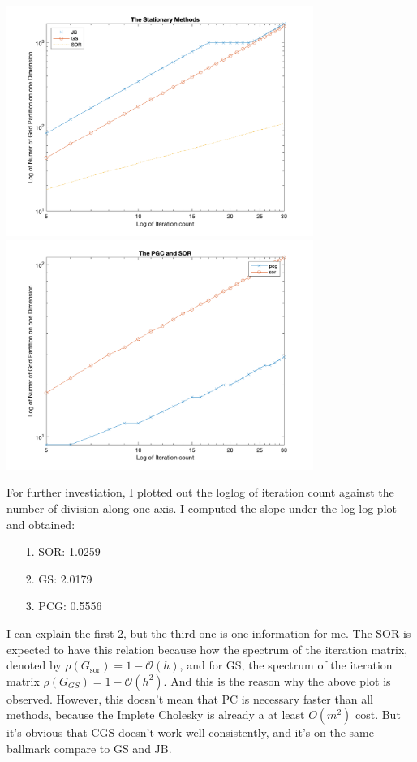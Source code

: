 \documentclass[]{article}
\begin{document}
    \begin{center}
        \includegraphics[width=10cm]{h_vs_stationary_methods.png}
        \includegraphics[width=10cm]{h_vs_pcg_sor.png}    
    \end{center}
    For further investiation, I plotted out the loglog of iteration count against the number of division along one axis. I computed the slope under the log log plot and obtained: 
    \begin{enumerate}
        \item [1.]SOR: 1.0259
        \item [2.]GS: 2.0179
        \item [3.]PCG: 0.5556
    \end{enumerate}
    I can explain the first 2, but the third one is one information for me. The SOR is expected to have this relation because how the spectrum of the iteration matrix, denoted by $\rho(G_{\text{sor}}) = 1 - \mathcal{O}(h)$, and for GS, the spectrum of the iteration matrix $\rho(G_{GS})= 1 -\mathcal{O}(h^2)$. And this is the reason why the above plot is observed. However, this doesn't mean that PC is necessary faster than all methods, because the Implete Cholesky is already a at least $O(m^2)$ cost. But it's obvious that CGS doesn't work well consistently, and it's on the same ballmark compare to GS and JB. 
\end{document}
